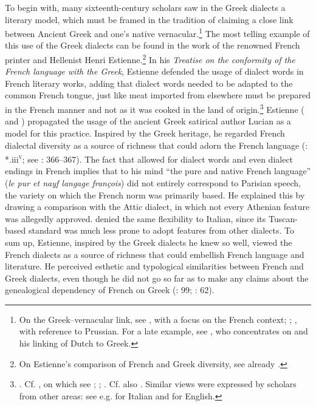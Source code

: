 To begin with, many sixteenth-century scholars saw in the Greek dialects a literary model, which must be framed in the tradition of claiming a close link between Ancient Greek and one’s native vernacular.\footnote{On the Greek–vernacular link, see \citet{Demaiziere1982}, with a focus on the French context; \citet{Trapp1990}; \citet{Dini2004}, with reference to Prussian. For a late example, see \citet[435--436]{VanHal2016}, who concentrates on \citet[119--132]{Reitz1730} and his linking of Dutch to Greek.} The most telling example of this use of the Greek dialects can be found in the work of the renowned French printer and Hellenist Henri Estienne.\footnote{On Estienne’s comparison of French and Greek diversity, see already \citet[70]{Demaiziere1988}.} In his \textit{Treatise on the conformity of the French language with the Greek}, Estienne defended the usage of dialect words in French literary works, adding that dialect words needed to be adapted to the common French tongue, just like meat imported from elsewhere must be prepared in the French manner and not as it was cooked in the land of origin.\footnote{\citet[¶¶.ii\textsc{\textsuperscript{v}}]{Estienne1565}. Cf. \citet[\texttt{\char"2720}\textsc{\textsuperscript{r}}]{Ronsard1550}, on which see \citet[170]{Alinei1984}; \citet[24]{Barbier-mueller1990}; \citet[14]{Trapp1990}. Cf. also \citet[456, 458]{Mambrun1661}. Similar views were expressed by scholars from other areas: see e.g. \citet[\textsc{e.}iii\textsc{\textsuperscript{v}}–\textsc{e.}iv\textsc{\textsuperscript{r}}]{Oreadini1525} for Italian and \citet[\textsc{a}.vi\textsc{\textsuperscript{r}}]{Craige1606} for English.} Estienne (\citet[133]{Estienne1579} and \citet[*.iii\textsc{\textsuperscript{v}}–*.iiii\textsc{\textsuperscript{r}}]{Estienne1582}) propagated the usage of the ancient Greek satirical author Lucian as a model for this practice. Inspired by the Greek heritage, he regarded French dialectal diversity as a source of richness that could adorn the French language (\citealt{Estienne1582}: *.iii\textsc{\textsuperscript{v}}; see \citealt{Auroux1992}: 366–367). The fact that \citet[143]{Estienne1579} allowed for dialect words and even dialect endings in French implies that to his mind “the pure and native French language” (\textit{le pur et nayf langage françois}) did not entirely correspond to Parisian speech, the variety on which the French norm was primarily based. He explained this by drawing a comparison with the Attic dialect, in which not every Athenian feature was allegedly approved. \citet[133--134]{Estienne1579} denied the same flexibility to Italian, since its Tuscan-based standard was much less prone to adopt features from other dialects. To sum up, Estienne, inspired by the Greek dialects he knew so well, viewed the French dialects as a source of richness that could embellish French language and literature. He perceived esthetic and typological similarities between French and Greek dialects, even though he did not go so far as to make any claims about the genealogical dependency of French on Greek (\citealt{Droixhe1978}: 99; \citealt{Considine2008a}: 62).

